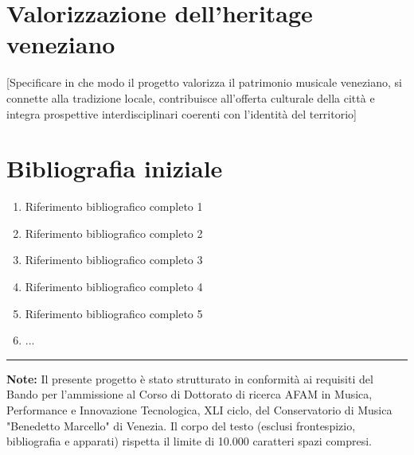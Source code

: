 \documentclass[11pt,a4paper]{article}
\begin{document}
\section{Valorizzazione dell'heritage veneziano}
[Specificare in che modo il progetto valorizza il patrimonio musicale veneziano, si connette alla tradizione locale, contribuisce all'offerta culturale della città e integra prospettive interdisciplinari coerenti con l'identità del territorio]

\newpage

\section*{Bibliografia iniziale}
\begin{enumerate}
    \item Riferimento bibliografico completo 1
    \item Riferimento bibliografico completo 2
    \item Riferimento bibliografico completo 3
    \item Riferimento bibliografico completo 4
    \item Riferimento bibliografico completo 5
    \item ...
\end{enumerate}

\vspace{1cm}

\noindent\rule{\textwidth}{0.4pt}

\small
\textbf{Note:} Il presente progetto è stato strutturato in conformità ai requisiti del Bando per l'ammissione al Corso di Dottorato di ricerca AFAM in Musica, Performance e Innovazione Tecnologica, XLI ciclo, del Conservatorio di Musica "Benedetto Marcello" di Venezia. Il corpo del testo (esclusi frontespizio, bibliografia e apparati) rispetta il limite di 10.000 caratteri spazi compresi.
\end{document}
